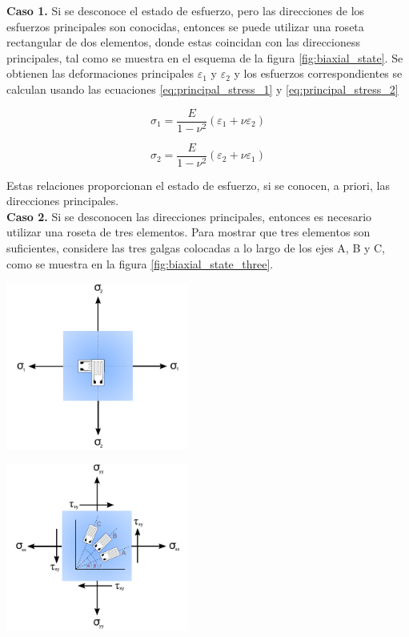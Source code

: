 \textbf{Caso 1.} Si se desconoce el estado de esfuerzo, pero las direcciones de los 
esfuerzos principales son conocidas, entonces se puede utilizar una roseta rectangular 
de dos elementos, donde estas coincidan con las direccioness principales, tal 
como se muestra en el esquema de la figura \ref{fig:biaxial_state}. Se obtienen las 
deformaciones principales $\varepsilon_1$ y $\varepsilon_2$ y los esfuerzos correspondientes 
se calculan usando las ecuaciones \ref{eq:principal_stress_1} y \ref{eq:principal_stress_2}  ~\cite{metu2011}

\begin{equation}\label{eq:principal_stress_1}
\sigma_1 = \frac{E}{1-\nu^2} \left( \varepsilon_1 + \nu\varepsilon_2 \right)
\end{equation}

\begin{equation}\label{eq:principal_stress_2}
\sigma_2 = \frac{E}{1-\nu^2} \left( \varepsilon_2 + \nu\varepsilon_1 \right)
\end{equation}

Estas relaciones proporcionan el estado de esfuerzo, si se conocen, a priori, las direcciones 
principales. \\

\textbf{Caso 2.} Si se desconocen las direcciones principales, entonces es necesario utilizar 
una roseta de tres elementos. Para mostrar que tres elementos son suficientes, considere las 
tres galgas colocadas a lo largo de los ejes A, B y C, como se muestra en la figura 
\ref{fig:biaxial_state_three}.

\begin{center}
\includegraphics[width=0.45\textwidth]{src/ch2/biaxial_state.pdf}
\label{fig:biaxial_state}
\end{center}

\begin{center}
\includegraphics[width=0.45\textwidth]{src/ch2/biaxial_state_three.pdf}
\label{fig:biaxial_state_three}
\end{center}


